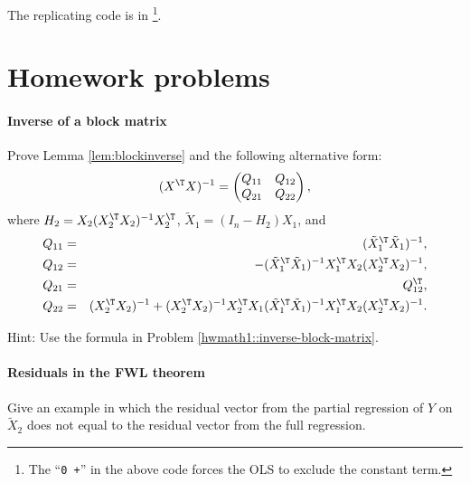 The replicating  code is in \footnote{The ``\texttt{0 +}'' in the above code forces the OLS to exclude the constant term.}.




\section{Homework problems}

\paragraph{Inverse of a block matrix}\label{hw6::inverse-block-gram}

Prove Lemma \ref{lem:blockinverse} and the following alternative form: 
$$
(X^{\T} X)^{-1} = \begin{pmatrix}
Q_{11} & Q_{12} \\
Q_{21} & Q_{22}
\end{pmatrix},
$$
where $H_2 = X_2(X_2^{\T} X_2)^{-1} X_2 ^{\T} $, $\tilde{X}_1 = (I_n - H_2) X_1$, and
\begin{eqnarray*}
Q_{11} &=& (\tilde{X}_1^{\T} \tilde{X}_1)^{-1} ,\\
Q_{12} &=& - (\tilde{X}_1^{\T} \tilde{X}_1)^{-1} X_1^{\T} X_2 (X_2^{\T} X_2)^{-1} ,\\
Q_{21} &=& Q_{12}^{\T},\\
Q_{22} &=& (X_2^{\T} X_2)^{-1}  + (X_2^{\T} X_2)^{-1} X_2^{\T} X_1 (\tilde{X}_1^{\T} \tilde{X}_1)^{-1} X_1^{\T} X_2 (X_2^{\T} X_2)^{-1}.
\end{eqnarray*}

Hint: Use the formula in Problem \ref{hwmath1::inverse-block-matrix}. 


 

\paragraph{Residuals in the FWL theorem}\label{hw06-fwl-residual}

Give an example in which the residual vector from the partial regression of $Y$ on $\tilde{X}_{2}$ does not equal to the residual vector from the full regression. 

 

%

